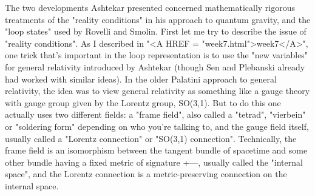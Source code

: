 The two developments Ashtekar presented concerned mathematically
rigorous treatments of the "reality conditions" in his approach to
quantum gravity, and the "loop states" used by Rovelli and Smolin.
First let me try to describe the issue of "reality
conditions".  As I described in "<A HREF = "week7.html">week7</A>", one trick that's important
in the loop representation is to use the "new variables" for
general relativity introduced by Ashtekar (though Sen and
Plebanski already had worked with similar ideas).  In the older
Palatini approach to general relativity, the idea was to view
general relativity as something like a gauge theory with gauge
group given by the Lorentz group, SO(3,1).   But to do this one
actually uses two different fields: a "frame field", also called
a "tetrad", "vierbein" or "soldering form" depending on who
you're talking to, and the gauge field itself, usually called a
"Lorentz connection" or "SO(3,1) connection".  Technically, the
frame field is an isomorphism between the tangent bundle of
spacetime and some other bundle having a fixed metric of
signature +---, usually called the "internal space", and the
Lorentz connection is a metric-preserving connection on the
internal space.   

